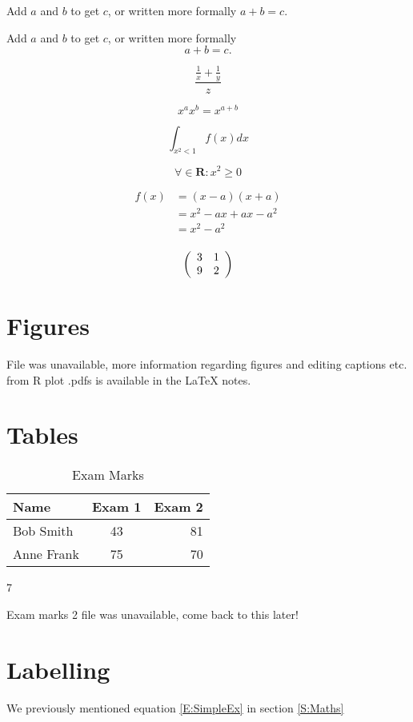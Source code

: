 \documentclass[a4paper, 10pt]{article}
\begin{document}
Add $a$ and $b$ to get $c$, or written more formally $a + b = c$.

Add $a$ and $b$ to get $c$, or written more formally
\begin{equation}
a + b = c. \label{E:SimpleEx}
\end{equation}


\[
\frac{\frac{1}{x}+\frac{1}{y}}{z}
\] 

\[
x^a x^b= x^{a+b}
\] 

\begin{equation*}
\int_{x^2 < 1}^{}
f(x) dx
\end{equation*}

\[
\forall \in \mathbf{R}:	x^2 \geq 0
\]

\begin{align*}
f(x) & = (x-a)(x+a) \\
& = x^2 - ax + ax - a^2 \\
& = x^2 - a^2 \\
\end{align*}

\[
\left(
\begin{array}
{c c}
3 & 1 \\
9 & 2 \\
\end{array}
\right)
\]

\section{Figures \label{S:Figures}}
File was unavailable, more information regarding figures and editing captions etc. from R plot .pdfs is available in the LaTeX notes.

\section{Tables \label{S:Tables}}
\begin{table}
\centering
\begin{tabular}{|l||c|r|} \hline
Name & Exam 1 & Exam 2 \\ \hline
Bob Smith & 43 & 81 \\
Anne Frank & 75 & 70 \\ \hline
\end{tabular}
7
\caption{Exam Marks}
\label{T:Exam Marks}
\end{table}

Exam marks 2 file was unavailable, come back to this later!

\section{Labelling \label{S:Labelling}}
We previously mentioned equation \ref{E:SimpleEx} in section \ref{S:Maths}
\end{document}
